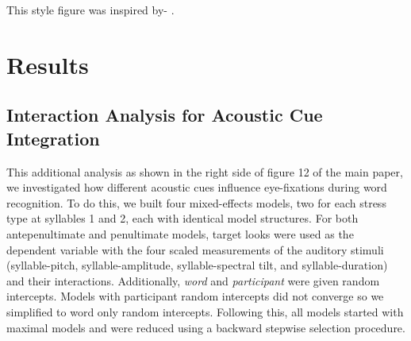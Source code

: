 \documentclass[sn-apa]{sn-jnl} %
\begin{document}
This style figure was inspired by-  \textcite{AOW}. 

\section{Results}

\subsection{Interaction Analysis for Acoustic Cue Integration}

This additional analysis as shown in the right side of figure 12 of the main paper, we investigated how different acoustic cues influence eye-fixations during word recognition. To do this, we built four mixed-effects models, two for each stress type at syllables 1 and 2, each with identical model structures. For both antepenultimate and penultimate models, target looks were used as the dependent variable with the four scaled measurements of the auditory stimuli (syllable-pitch, syllable-amplitude, syllable-spectral tilt, and syllable-duration) and their interactions. Additionally, \textit{word} and \textit{participant} were given random intercepts. Models with participant random intercepts did not converge so we simplified to word only random intercepts. Following this, all models started with maximal models and were reduced using a backward stepwise selection procedure. 
\end{document}
